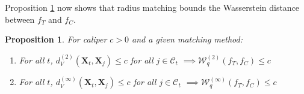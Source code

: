 \documentclass{article}
\newtheorem{proposition}[theorem]{Proposition}
\newcommand{\Xt}{\mathbf{X}_t}
\newcommand{\Xj}{\mathbf{X}_j}
\newcommand{\Ct}{\mathcal{C}_{t}}
\begin{document}

Proposition \ref{prop:wass} now shows that radius matching bounds the Wasserstein distance between $f_T$ and $f_C$.

\begin{proposition}
\label{prop:wass}
    For caliper $c > 0$ and a given matching method:
    \begin{enumerate}[label=(\alph*)]
        \item For all $t$, $d^{(2)}_V(\Xt, \Xj) \leq c$ for all $j \in \Ct$
            $\implies \mathcal{W}^{(2)}_q(f_T, f_C) \leq c$
        \item For all $t$, $d^{(\infty)}_V(\Xt, \Xj) \leq c$ for all $j \in \Ct$
            $\implies \mathcal{W}^{(\infty)}_q(f_T, f_C) \leq c$
    \end{enumerate}
\end{proposition}
\end{document}
